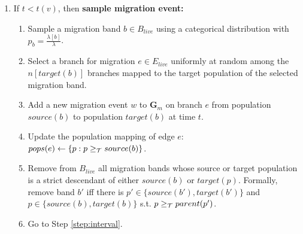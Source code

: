 \documentclass[11pt]{article}
\newcommand{\vect}[1]{\boldsymbol{\mathbf{#1}}}
\newcommand{\G}{\vect{G}}
\newcommand{\1}{\mathbbm{1}}
\newcommand{\Gm}{\G_m}
\begin{document}
\begin{enumerate}
  \item \label{step:sample-mig} If $t<t(v)$, then \textbf{sample migration event:}
  \begin{enumerate}
    \item \label{step:mig_band} Sample a migration band $b\in B_{live}$ using a categorical distribution with $p_b=\frac{\lambda[b]}{\lambda}$.
    \item \label{step:mig_branch} Select a branch for migration $e\in E_{live}$ uniformly at random among the $n[target(b)]$ branches mapped to the target population of the selected migration band.
    \item Add a new migration event $w$ to $\Gm$ on branch $e$ from population $source(b)$ to population $target(b)$ at time $t$.
    \item \label{step:mig_mapping} Update the population mapping of edge $e$: $pops(e)\leftarrow\{p:p\geq_{\mathcal{T}} source(b)\}$.
    \item  \label{step:ub_mig} Remove from $B_{live}$ all migration bands whose source or target population is a strict descendant of either $source(b)$ or $target(p)$.
    Formally, remove band $b'$ iff there is $p'\in\{source(b'),target(b')\}$ and $p\in\{source(b),target(b)\}$  s.t. $p\geq_{\mathcal{T}} parent(p')$.
   
    \item Go to Step \ref{step:interval}.
  \end{enumerate}
  

\end{enumerate}
\end{document}
